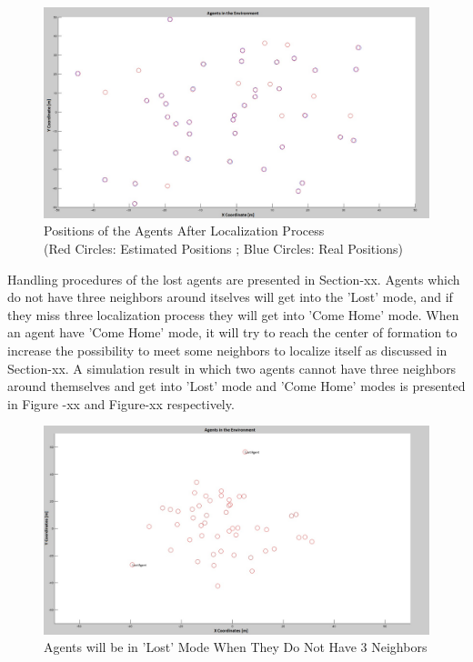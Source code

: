 \begin{figure}[H]
\caption{Positions of the Agents After Localization Process \\
(Red Circles: Estimated Positions ; Blue Circles: Real Positions)}
\centerline{\includegraphics[scale = 0.30]{Pozisyon-1-Duzeltilmis}}
\end{figure} 
		
Handling procedures of the lost agents are presented in Section-xx. Agents which do not have three neighbors around itselves will get into the 'Lost' mode, and if  they miss three localization process they will get into 'Come Home' mode. When an agent have 'Come Home' mode, it will try to reach the center of formation to increase the possibility to meet some neighbors to localize itself as discussed in Section-xx. A simulation result in which two agents cannot have three neighbors around themselves and get into 'Lost' mode and 'Come Home' modes  is presented in Figure -xx and Figure-xx respectively.
		
\begin{figure}[H]
\caption{Agents will be in 'Lost' Mode When They Do Not Have 3 Neighbors}
\centerline{\includegraphics[scale = 0.30]{Lost-2-2}}
\end{figure} 

